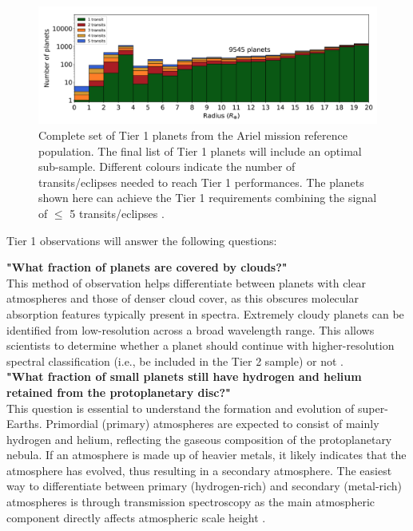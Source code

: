 \documentclass[12pt]{article}
\begin{document}
\begin{figure}[H]
    \centering
    \includegraphics[width=.9\textwidth]{tier 1 transit graph.png}
    \caption{Complete set of Tier 1 planets from the Ariel mission reference population. The final list of Tier 1 planets will include an optimal sub-sample. Different colours indicate the number of transits/eclipses needed to reach
    Tier 1 performances. The planets shown here can achieve the Tier 1 requirements combining the signal of $\leq$ 5 transits/eclipses \protect\cite{zingales2018ariel}.}
    \label{fig:3}
\end{figure}

Tier 1 observations will answer the following questions:

\textbf{"What fraction of planets are covered by clouds?"}\\
This method of observation helps differentiate between planets with clear atmospheres and those of denser cloud cover, as this obscures molecular absorption features typically present in spectra.
Extremely cloudy planets can be identified from low-resolution across a broad wavelength range. This allows scientists to determine whether a planet should continue with higher-resolution spectral classification
(i.e., be included in the Tier 2 sample) or not \cite{salvignol2024ariel}.\\

\textbf{"What fraction of small planets still have hydrogen and helium retained from the protoplanetary disc?"}\\
This question is essential to understand the formation and evolution of super-Earths. Primordial (primary) atmospheres are expected to consist of mainly hydrogen and helium,
reflecting the gaseous composition of the protoplanetary nebula. If an atmosphere is made up of heavier metals, it likely indicates that the atmosphere has evolved, thus resulting in a secondary atmosphere.
The easiest way to differentiate between primary (hydrogen-rich) and secondary (metal-rich) atmospheres is through transmission spectroscopy as the main atmospheric component directly affects atmospheric scale height \cite{salvignol2024ariel}. \\
\end{document}
